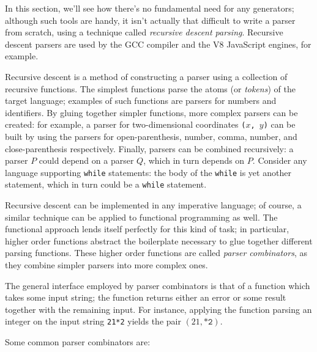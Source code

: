 \documentclass[11pt, american, draft]{PhdThesis}
\begin{document}
  In this section, we'll see how there's no fundamental need for any generators; although such tools
  are handy, it isn't actually that difficult to write a parser from scratch, using a technique
  called \emph{recursive descent parsing}. Recursive descent parsers are used by the GCC compiler
  and the V8 JavaScript engines, for example\cite{nystrom}.

  Recursive descent is a method of constructing a parser using a collection of recursive functions.
  The simplest functions parse the atoms (or \emph{tokens}) of the target language; examples of such
  functions are parsers for numbers and identifiers. By gluing together simpler functions, more
  complex parsers can be created: for example, a parser for two-dimensional coordinates
  \mbox{\texttt{($x$, $y$)}} can be built by using the parsers for open-parenthesis, number, comma,
  number, and close-parenthesis respectively. Finally, parsers can be combined recursively: a parser
  $P$ could depend on a parser $Q$, which in turn depends on $P$. Consider any language supporting
  \verb$while$ statements: the body of the \verb$while$ is yet another statement, which in turn
  could be a \verb$while$ statement.

  Recursive descent can be implemented in any imperative language; of course, a similar technique
  can be applied to functional programming as well. The functional approach lends itself perfectly
  for this kind of task; in particular, higher order functions abstract the boilerplate necessary to
  glue together different parsing functions. These higher order functions are called \emph{parser
  combinators}, as they combine simpler parsers into more complex ones.

  The general interface employed by parser combinators is that of a function which takes some input
  string; the function returns either an error or some result together with the remaining input. For
  instance, applying the function parsing an integer on the input string \verb$21*2$ yields the
  pair \mbox{$\left(21, \texttt{*2}\right)$}.

  Some common parser combinators are:
\end{document}

